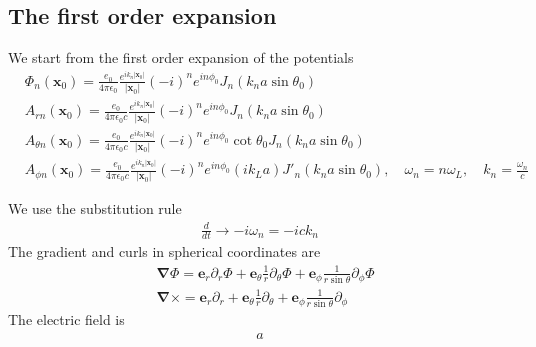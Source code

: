 \subsection{The first order expansion}

We start from the first order expansion of the potentials
\begin{align}
     & \Phi_n({\bm x}_0)=\frac{e_0}{4\pi\epsilon_0}\frac{e^{ik_n |{\bm x}_0|}}{|{\bm x}_0|}(-i)^ne^{in\phi_0}J_n(k_na\sin\theta_0)                                                                    \\
     & A_{rn}({\bm x}_0)= \frac{e_0}{4\pi\epsilon_0c}\frac{e^{ik_n |{\bm x}_0|}}{|{\bm x}_0|}(-i)^ne^{in\phi_0}J_n(k_na\sin\theta_0)                                                                  \\
     & A_{\theta n}({\bm x}_0)= \frac{e_0}{4\pi\epsilon_0c}\frac{e^{ik_n |{\bm x}_0|}}{|{\bm x}_0|}(-i)^ne^{in\phi_0}\cot\theta_0J_n(k_na\sin\theta_0)                                                \\
     & A_{\phi n}({\bm x}_0)=\frac{e_0}{4\pi\epsilon_0c}\frac{e^{ik_n |{\bm x}_0|}}{|{\bm x}_0|}(-i)^ne^{in\phi_0}(ik_La)J'_n(k_na\sin\theta_0), \quad \omega_n=n\omega_L, \quad k_n=\frac{\omega_n}c
\end{align}

We use the substitution rule
\begin{align}
    \frac{d}{dt}\rightarrow-i\omega_n=-ick_n
\end{align}
The gradient and curls in spherical coordinates are
\begin{align}
     & {\boldsymbol{\nabla}}\Phi={\bm e}_r\partial_r\Phi+{\bm e}_\theta\frac1r\partial_\theta\Phi+{\bm e}_\phi\frac1{r\sin\theta}\partial_\phi\Phi \\
     & {\boldsymbol{\nabla}}\times={\bm e}_r\partial_r+{\bm e}_\theta\frac1r\partial_\theta+{\bm e}_\phi\frac1{r\sin\theta}\partial_\phi
\end{align}
The electric field is
\begin{align}
    a
\end{align}